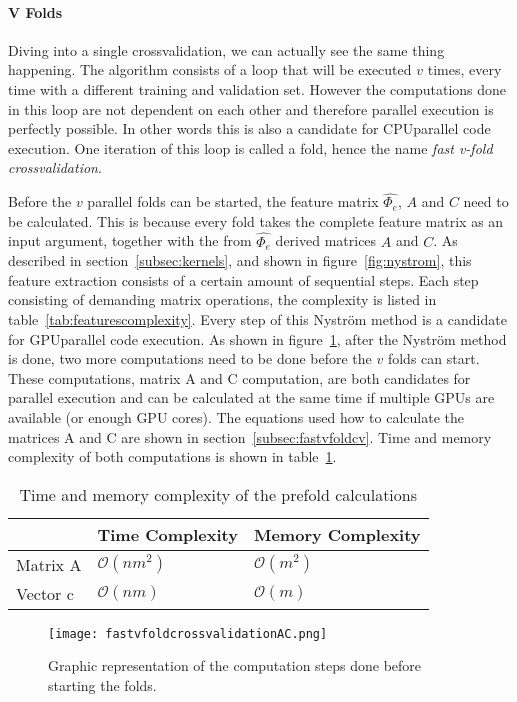 \paragraph{V Folds} 
Diving into a single crossvalidation, we can actually see the same thing happening.
The algorithm consists of a loop that will be executed $v$ times, every time with a different training and validation set.
However the computations done in this loop are not dependent on each other and therefore parallel execution is perfectly possible.
In other words this is also a candidate for CPUparallel code execution.
One iteration of this loop is called a fold, hence the name \textit{fast v-fold crossvalidation}.
\par 
Before the $v$ parallel folds can be started, the feature matrix $\hat{\Phi_e}$, $A$ and $C$ need to be calculated.
This is because every fold takes the complete feature matrix as an input argument, together with the from $\hat{\Phi_e}$ derived matrices $A$ and $C$.
As described in section~\ref{subsec:kernels}, and shown in figure~\ref{fig:nystrom}, this feature extraction consists of a certain amount of sequential steps.
Each step consisting of demanding matrix operations, the complexity is listed in table~\ref{tab:featurescomplexity}.
Every step of this Nystr\"om method is a candidate for GPUparallel code execution.
As shown in figure~\ref{fig:prefold}, after the Nystr\"om method is done, two more computations need to be done before the $v$ folds can start.
These computations, matrix A and C computation, are both candidates for parallel execution and can be calculated at the same time if multiple GPUs are available (or enough GPU cores).
The equations used how to calculate the matrices A and C are shown in section~\ref{subsec:fastvfoldcv}.
Time and memory complexity of both computations is shown in table~\ref{tab:prefold}.
\begin{table}[]
	\centering
	\begin{tabular}{lll}
		& Time Complexity     & Memory Complexity  \\ \hline
		\multicolumn{1}{l|}{Matrix A} & $\mathcal{O}(nm^2)$ & $\mathcal{O}(m^2)$ \\
		\multicolumn{1}{l|}{Vector c} & $\mathcal{O}(nm)$   & $\mathcal{O}(m)$  
	\end{tabular}
	\caption{Time and memory complexity of the prefold calculations}
	\label{tab:prefold}
\end{table}
\begin{figure}
	\centering
	\texttt{[image: fastvfoldcrossvalidationAC.png]}
	\caption{Graphic representation of the computation steps done before starting the folds.}
	\label{fig:prefold}
\end{figure}
